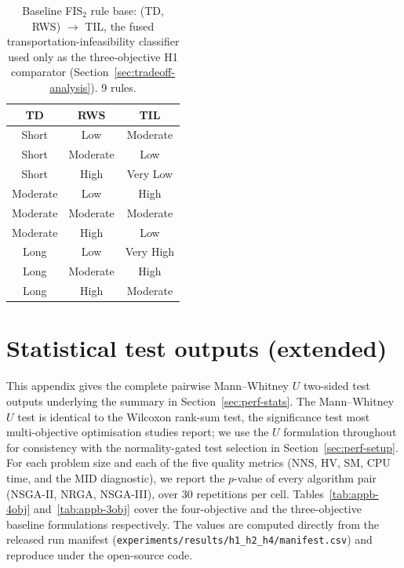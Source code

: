 \documentclass[applsci,article,submit,moreauthors,pdftex]{Definitions/mdpi}
\begin{document}
\begin{table}[!ht]
\centering\footnotesize
\setlength{\tabcolsep}{6pt}
\caption{Baseline FIS$_2$ rule base: (TD, RWS) $\to$ TIL, the fused
transportation-infeasibility classifier used only as the three-objective
H1 comparator (Section~\ref{sec:tradeoff-analysis}). 9 rules.}
\label{tab:rules-fis2-baseline}
\begin{tabular}{ccc}
\toprule
TD & RWS & TIL \\
\midrule
Short & Low & Moderate \\
Short & Moderate & Low \\
Short & High & Very Low \\
Moderate & Low & High \\
Moderate & Moderate & Moderate \\
Moderate & High & Low \\
Long & Low & Very High \\
Long & Moderate & High \\
Long & High & Moderate \\
\bottomrule
\end{tabular}
\end{table}

\section{Statistical test outputs (extended)}\label{app:stats}

This appendix gives the complete pairwise Mann--Whitney $U$ two-sided test
outputs underlying the summary in Section~\ref{sec:perf-stats}. The
Mann--Whitney $U$ test is identical to the Wilcoxon rank-sum test, the
significance test most multi-objective optimisation studies report; we use the
$U$ formulation throughout for consistency with the normality-gated test
selection in Section~\ref{sec:perf-setup}. For each
problem size and each of the five quality metrics (NNS, HV, SM, CPU time, and
the MID diagnostic), we report the $p$-value of every algorithm pair (NSGA-II, NRGA,
NSGA-III), over 30 repetitions per cell. Tables~\ref{tab:appb-4obj}
and~\ref{tab:appb-3obj} cover the four-objective and the three-objective
baseline formulations respectively. The values are computed directly from
the released run manifest
(\texttt{experiments/results/h1\_h2\_h4/manifest.csv}) and reproduce under
the open-source code.
\end{document}
